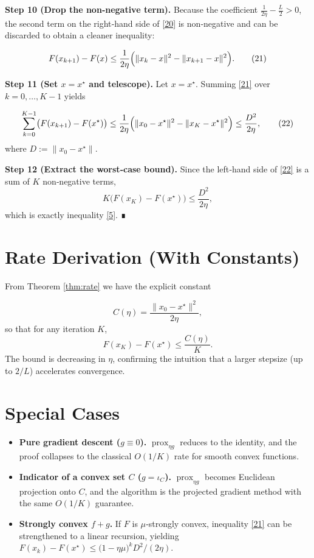 \documentclass{article}
\newcommand{\prox}{\operatorname{prox}}
\begin{document}
\noindent\textbf{Step 10 (Drop the non‑negative term).}  
Because the coefficient $\frac{1}{2\eta}-\frac{L}{2}>0$, the second term on the right‑hand side of \eqref{20} is non‑negative and can be discarded to obtain a cleaner inequality:

\[
F(x_{k+1})-F(x)\le
\frac{1}{2\eta}\Bigl(\|x_{k}-x\|^{2}-\|x_{k+1}-x\|^{2}\Bigr). \tag{21}
\]

\noindent\textbf{Step 11 (Set $x=x^{\star}$ and telescope).}  
Let $x=x^{\star}$. Summing \eqref{21} over $k=0,\dots,K-1$ yields  

\[
\sum_{k=0}^{K-1}\bigl(F(x_{k+1})-F(x^{\star})\bigr)
\le\frac{1}{2\eta}\Bigl(\|x_{0}-x^{\star}\|^{2}-\|x_{K}-x^{\star}\|^{2}\Bigr)
\le\frac{D^{2}}{2\eta}, \tag{22}
\]
where $D:=\|x_{0}-x^{\star}\|$.

\noindent\textbf{Step 12 (Extract the worst‑case bound).}  
Since the left‑hand side of \eqref{22} is a sum of $K$ non‑negative terms,
\[
K\bigl(F(x_{K})-F(x^{\star})\bigr)\le\frac{D^{2}}{2\eta},
\]
which is exactly inequality \eqref{5}. ∎

\section*{Rate Derivation (With Constants)}
From Theorem \ref{thm:rate} we have the explicit constant  

\[
C(\eta)=\frac{\|x_{0}-x^{\star}\|^{2}}{2\eta},
\]
so that for any iteration $K$,
\[
F(x_{K})-F(x^{\star})\le\frac{C(\eta)}{K}.
\]
The bound is decreasing in $\eta$, confirming the intuition that a larger stepsize (up to $2/L$) accelerates convergence.

\section*{Special Cases}
\begin{itemize}
  \item \textbf{Pure gradient descent ($g\equiv0$).} $\prox_{\eta g}$ reduces to the identity, and the proof collapses to the classical $O(1/K)$ rate for smooth convex functions.
  \item \textbf{Indicator of a convex set $C$ ($g=\iota_{C}$).} $\prox_{\eta g}$ becomes Euclidean projection onto $C$, and the algorithm is the projected gradient method with the same $O(1/K)$ guarantee.
  \item \textbf{Strongly convex $f+g$.} If $F$ is $\mu$‑strongly convex, inequality \eqref{21} can be strengthened to a linear recursion, yielding $F(x_{k})-F(x^{\star})\le\bigl(1-\eta\mu\bigr)^{k}D^{2}/(2\eta)$.
\end{itemize}
\end{document}
